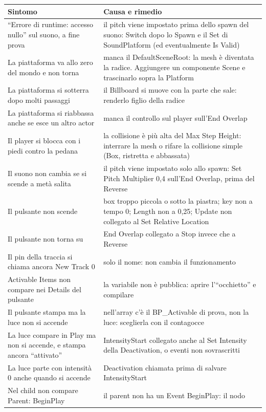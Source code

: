 \begin{table}[htbp]
\centering
\small
\begin{tabular}{@{}p{5.4cm}p{8.6cm}@{}}
\toprule
\textbf{Sintomo} & \textbf{Causa e rimedio} \\
\midrule
``Errore di runtime: accesso nullo'' sul suono, a fine prova & il pitch viene impostato
prima dello spawn del suono: Switch dopo lo Spawn e il Set di SoundPlatform (ed
eventualmente Is Valid) \\
La piattaforma va allo zero del mondo e non torna & manca il DefaultSceneRoot: la mesh è
diventata la radice. Aggiungere un componente Scene e trascinarlo sopra la Platform \\
La piattaforma si sotterra dopo molti passaggi & il Billboard si muove con la parte che
sale: renderlo figlio della radice \\
La piattaforma si riabbassa anche se esce un altro actor & manca il controllo sul player
sull'End Overlap \\
Il player si blocca con i piedi contro la pedana & la collisione è più alta del Max
Step Height: interrare la mesh o rifare la collisione simple (Box, ristretta e
abbassata) \\
Il suono non cambia se si scende a metà salita & il pitch viene impostato solo allo
spawn: Set Pitch Multiplier 0,4 sull'End Overlap, prima del Reverse \\
Il pulsante non scende & box troppo piccola o sotto la piastra; key non a tempo 0;
Length non a 0,25; Update non collegato al Set Relative Location \\
Il pulsante non torna su & End Overlap collegato a Stop invece che a Reverse \\
Il pin della traccia si chiama ancora New Track 0 & solo il nome: non cambia il
funzionamento \\
Activable Items non compare nei Details del pulsante & la variabile non è pubblica:
aprire l'``occhietto'' e compilare \\
Il pulsante stampa ma la luce non si accende & nell'array c'è il BP\_Activable di prova,
non la luce: sceglierla con il contagocce \\
La luce compare in Play ma non si accende, e stampa ancora ``attivato'' & IntensityStart
collegato anche al Set Intensity della Deactivation, o eventi non sovrascritti \\
La luce parte con intensità 0 anche quando si accende & Deactivation chiamata prima di
salvare IntensityStart \\
Nel child non compare Parent: BeginPlay & il parent non ha un Event BeginPlay: il nodo

\end{tabular}
\end{table}
